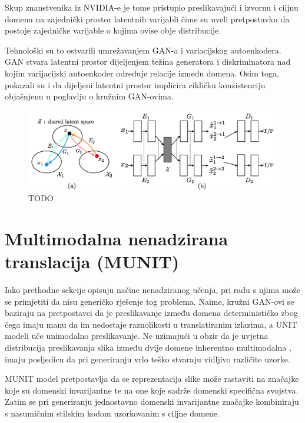 \documentclass[lmodern, utf8, seminar]{fer}
\begin{document}
Skup znanstvenika iz NVIDIA-e je tome pristupio preslikavajući i izvornu i ciljnu domenu na zajednički prostor latentnih varijabli čime su uveli pretpostavku da postoje zajedničke varijable o kojima ovise obje distribucije. 

Tehnološki su to ostvarili umrežavanjem GAN-a i variacijskog autoenkodera. GAN stvara latentni prostor dijeljenjem težina generatora i diskriminatora nad kojim varijacijski autoenkoder određuje relacije između domena. 
Osim toga, pokazali su \cite{liu2017unsupervised} i da dijeljeni latentni prostor implicira cikličku konzistenciju objašnjenu u poglavlju o kružnim GAN-ovima.
\newline

\begin{figure}[H]
    \centering
    \includegraphics[width=1\textwidth]{liu2017unsupervised-unit}
    \caption{ TODO }
    \label{fig:liu2017unsupervised-unit}
\end{figure}


\newpage
\section{Multimodalna nenadzirana translacija (MUNIT)}
Iako prethodne sekcije opisuju načine nenadziranog učenja, pri radu s njima može se primjetiti da nisu generičko rješenje tog problema. Naime, kružni GAN-ovi se baziraju na pretpostavci da je preslikavanje između domena determinističko zbog čega imaju manu da im nedostaje raznolikosti u translatiranim izlazima, a UNIT modeli uče unimodalno preslikavanje. Ne uzimajući u obzir da je uvjetna distribucija preslikavanja slika između dvije domene inherentno multimodalna \cite{huang2018multimodal}, imaju posljedicu  da pri generiranju vrlo teško stvaraju vidljivo različite uzorke. 

MUNIT model pretpostavlja da se reprezentacija slike može rastaviti na značajke koje su domenski invarijantne te na one koje sadrže domenski specifična svojstva. Zatim se pri generiranju jednostavno domenski invarijantne značajke kombiniraju s nasumičnim stilskim kodom uzorkovanim s ciljne domene.
\newline
\end{document}

